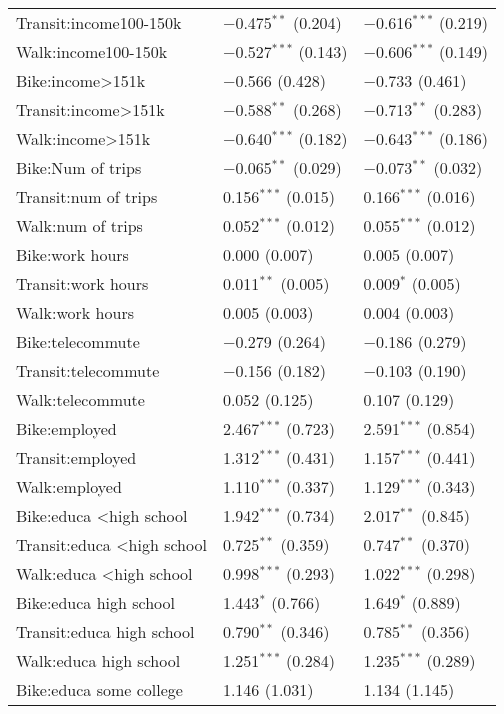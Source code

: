\begin{longtabu}{lll}
	Transit:income100-150k & $-$0.475$^{**}$ (0.204) & $-$0.616$^{***}$ (0.219) \\ 
	Walk:income100-150k & $-$0.527$^{***}$ (0.143) & $-$0.606$^{***}$ (0.149) \\ 
	Bike:income\textgreater 151k & $-$0.566 (0.428) & $-$0.733 (0.461) \\ 
	Transit:income\textgreater 151k & $-$0.588$^{**}$ (0.268) & $-$0.713$^{**}$ (0.283) \\ 
	Walk:income\textgreater 151k & $-$0.640$^{***}$ (0.182) & $-$0.643$^{***}$ (0.186) \\ 
	Bike:Num of trips & $-$0.065$^{**}$ (0.029) & $-$0.073$^{**}$ (0.032) \\ 
	Transit:num of trips & 0.156$^{***}$ (0.015) & 0.166$^{***}$ (0.016) \\ 
	Walk:num of trips & 0.052$^{***}$ (0.012) & 0.055$^{***}$ (0.012) \\ 
	Bike:work hours & 0.000 (0.007) & 0.005 (0.007) \\ 
	Transit:work hours & 0.011$^{**}$ (0.005) & 0.009$^{*}$ (0.005) \\ 
	Walk:work hours & 0.005 (0.003) & 0.004 (0.003) \\ 
	Bike:telecommute & $-$0.279 (0.264) & $-$0.186 (0.279) \\ 
	Transit:telecommute & $-$0.156 (0.182) & $-$0.103 (0.190) \\ 
	Walk:telecommute & 0.052 (0.125) & 0.107 (0.129) \\ 
	Bike:employed & 2.467$^{***}$ (0.723) & 2.591$^{***}$ (0.854) \\ 
	Transit:employed & 1.312$^{***}$ (0.431) & 1.157$^{***}$ (0.441) \\ 
	Walk:employed & 1.110$^{***}$ (0.337) & 1.129$^{***}$ (0.343) \\ 
	Bike:educa \textless high school & 1.942$^{***}$ (0.734) & 2.017$^{**}$ (0.845) \\ 
	Transit:educa \textless high school & 0.725$^{**}$ (0.359) & 0.747$^{**}$ (0.370) \\ 
	Walk:educa \textless high school & 0.998$^{***}$ (0.293) & 1.022$^{***}$ (0.298) \\ 
	Bike:educa high school & 1.443$^{*}$ (0.766) & 1.649$^{*}$ (0.889) \\ 
	Transit:educa high school & 0.790$^{**}$ (0.346) & 0.785$^{**}$ (0.356) \\ 
	Walk:educa high school & 1.251$^{***}$ (0.284) & 1.235$^{***}$ (0.289) \\ 
	Bike:educa some college & 1.146 (1.031) & 1.134 (1.145) \\ 

\end{longtabu}
